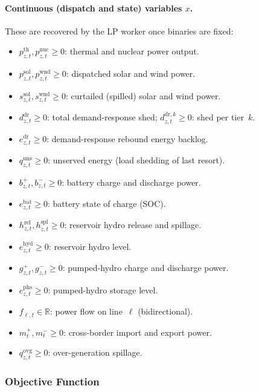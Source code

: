 \documentclass{article}
\begin{document}
\paragraph{Continuous (dispatch and state) variables $x$.}
These are recovered by the LP worker once binaries are fixed:
\begin{itemize}[noitemsep]
  \item $p^{\mathrm{th}}_{z,t}, p^{\mathrm{nuc}}_{z,t} \geq 0$: thermal and nuclear power output.
  \item $p^{\mathrm{sol}}_{z,t}, p^{\mathrm{wnd}}_{z,t} \geq 0$: dispatched solar and wind power.
  \item $s^{\mathrm{sol}}_{z,t}, s^{\mathrm{wnd}}_{z,t} \geq 0$: curtailed (spilled) solar and wind power.
  \item $d^{\mathrm{dr}}_{z,t} \geq 0$: total demand-response shed; $d^{\mathrm{dr},k}_{z,t} \geq 0$: shed per tier~$k$.
  \item $e^{\mathrm{dr}}_{z,t} \geq 0$: demand-response rebound energy backlog.
  \item $q^{\mathrm{uns}}_{z,t} \geq 0$: unserved energy (load shedding of last resort).
  \item $b^{+}_{z,t}, b^{-}_{z,t} \geq 0$: battery charge and discharge power.
  \item $e^{\mathrm{bat}}_{z,t} \geq 0$: battery state of charge (SOC).
  \item $h^{\mathrm{rel}}_{z,t}, h^{\mathrm{spl}}_{z,t} \geq 0$: reservoir hydro release and spillage.
  \item $e^{\mathrm{hyd}}_{z,t} \geq 0$: reservoir hydro level.
  \item $g^{+}_{z,t}, g^{-}_{z,t} \geq 0$: pumped-hydro charge and discharge power.
  \item $e^{\mathrm{phs}}_{z,t} \geq 0$: pumped-hydro storage level.
  \item $f_{\ell,t} \in \mathbb{R}$: power flow on line~$\ell$ (bidirectional).
  \item $m^{+}_{t}, m^{-}_{t} \geq 0$: cross-border import and export power.
  \item $q^{\mathrm{ovg}}_{z,t} \geq 0$: over-generation spillage.
\end{itemize}

\subsubsection{Objective Function}
\label{sec:milp_objective}
\end{document}
